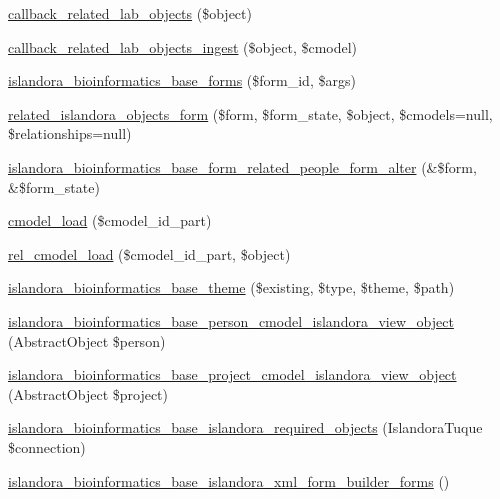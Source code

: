 \begin{DoxyCompactItemize}
\item 
\hyperlink{islandora__bioinformatics__base_8module_a68c82f4c7760c83fb600e25c7d5a23a3}{callback\+\_\+related\+\_\+lab\+\_\+objects} (\$object)
\item 
\hyperlink{islandora__bioinformatics__base_8module_a6c31991c3bd91b6c9c008c69b8fe7f87}{callback\+\_\+related\+\_\+lab\+\_\+objects\+\_\+ingest} (\$object, \$cmodel)
\item 
\hyperlink{islandora__bioinformatics__base_8module_a2e95f32f792ce2fcd79c32895fcdbe43}{islandora\+\_\+bioinformatics\+\_\+base\+\_\+forms} (\$form\+\_\+id, \$args)
\item 
\hyperlink{islandora__bioinformatics__base_8module_a746c0835872899ef0101a8a047c8c505}{related\+\_\+islandora\+\_\+objects\+\_\+form} (\$form, \$form\+\_\+state, \$object, \$cmodels=null, \$relationships=null)
\item 
\hyperlink{islandora__bioinformatics__base_8module_a833d478f4f75aec1a655731d56a9524d}{islandora\+\_\+bioinformatics\+\_\+base\+\_\+form\+\_\+related\+\_\+people\+\_\+form\+\_\+alter} (\&\$form, \&\$form\+\_\+state)
\item 
\hyperlink{islandora__bioinformatics__base_8module_a1f0c9c90de4c35b92c19c63a7cbe74b4}{cmodel\+\_\+load} (\$cmodel\+\_\+id\+\_\+part)
\item 
\hyperlink{islandora__bioinformatics__base_8module_abaa5d1481d1ed7e3ca134bb436b0c325}{rel\+\_\+cmodel\+\_\+load} (\$cmodel\+\_\+id\+\_\+part, \$object)
\item 
\hyperlink{islandora__bioinformatics__base_8module_a76e704c8060620f768f46bd4bacb05e0}{islandora\+\_\+bioinformatics\+\_\+base\+\_\+theme} (\$existing, \$type, \$theme, \$path)
\item 
\hyperlink{islandora__bioinformatics__base_8module_a28377c1d1eb3975107460a21b1900eaf}{islandora\+\_\+bioinformatics\+\_\+base\+\_\+person\+\_\+cmodel\+\_\+islandora\+\_\+view\+\_\+object} (Abstract\+Object \$person)
\item 
\hyperlink{islandora__bioinformatics__base_8module_aebd7ef53bd26dabff33c8d9ed965c355}{islandora\+\_\+bioinformatics\+\_\+base\+\_\+project\+\_\+cmodel\+\_\+islandora\+\_\+view\+\_\+object} (Abstract\+Object \$project)
\item 
\hyperlink{islandora__bioinformatics__base_8module_af49c8c4cdada468ea2f38053c815b8d0}{islandora\+\_\+bioinformatics\+\_\+base\+\_\+islandora\+\_\+required\+\_\+objects} (Islandora\+Tuque \$connection)
\item 
\hyperlink{islandora__bioinformatics__base_8module_a991861672652485988688d28b516bd2f}{islandora\+\_\+bioinformatics\+\_\+base\+\_\+islandora\+\_\+xml\+\_\+form\+\_\+builder\+\_\+forms} ()

\end{DoxyCompactItemize}
